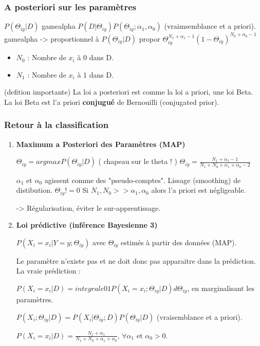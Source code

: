 \documentclass{article}
\begin{document}
\subsubsection{A posteriori sur les paramètres}

$ P(\Theta_{iy} | D)$ gamealpha $P(D | \Theta_{iy}) P(\Theta_{iy}; \alpha_1, \alpha_0)$ (vraimsemblance et a priori).
gamealpha -> proportionnel à
$ P(\Theta_{iy} | D)$ propor $\Theta_{iy}^{N_1 + \alpha_1 - 1} (1 - \Theta_{iy})^{N_0 + \alpha_0 - 1}$

\begin{itemize}
\item $N_0$ : Nombre de $x_i$ à 0 dans D.
\item $N_1$ : Nombre de $x_i$ à 1 dans D.
\end{itemize}

(defition importante)
La loi a posteriori est comme la loi a priori, une loi Beta. La loi Beta est l'a priori \textbf{conjugué} de Bernouilli (conjugated prior).

\subsubsection{Retour à la classification}

\begin{enumerate}

\item \textbf{Maximum a Posteriori des Paramètres (MAP)}

$ \Theta_{iy} = argmax P(\Theta_{iy} | D) $ ( chapeau sur le theta ! )
$ \Theta_{iy} = \frac{N_1 + \alpha_1 - 1}{N_1 + N_0 + \alpha_1 + \alpha_0 - 2} $

$\alpha_1$ et $\alpha_0$ agissent comme des "pseudo-comptes". Lissage (smoothing) de distibution.
$\Theta_{iy} != 0$
Si $N_1, N_0 >> \alpha_1, \alpha_0$ alors l'a priori est négligeable.

-> Régularisation, éviter le sur-apprentissage.

\item \textbf{Loi prédictive (inférence Bayesienne 3)}

$P(X_i = x_i | Y = y; \Theta_{iy})$ avec $\Theta_{iy}$ estimés à partir des données (MAP).

Le paramètre n'existe pas et ne doit donc pas apparaitre dans la prédiction. La vraie prédiction :

$P(X_i = x_i | D) = integrale01 P(X_i = x_i; \Theta_{iy} | D) d \Theta_{iy}$, en marginalisant les paramètres.

$P(X_i; \Theta_{iy} | D) = P(X_i | \Theta_{iy}; D) P(\Theta_{iy} | D)$ (vraisemblance et a priori).

$ P(X_i = x_i | D) = \frac{N_1 + \alpha_1}{N_1 + N_0 + \alpha_1 + \alpha_0}$, $\forall \alpha_1$ et $\alpha_0 > 0$.

\end{enumerate}
\end{document}
